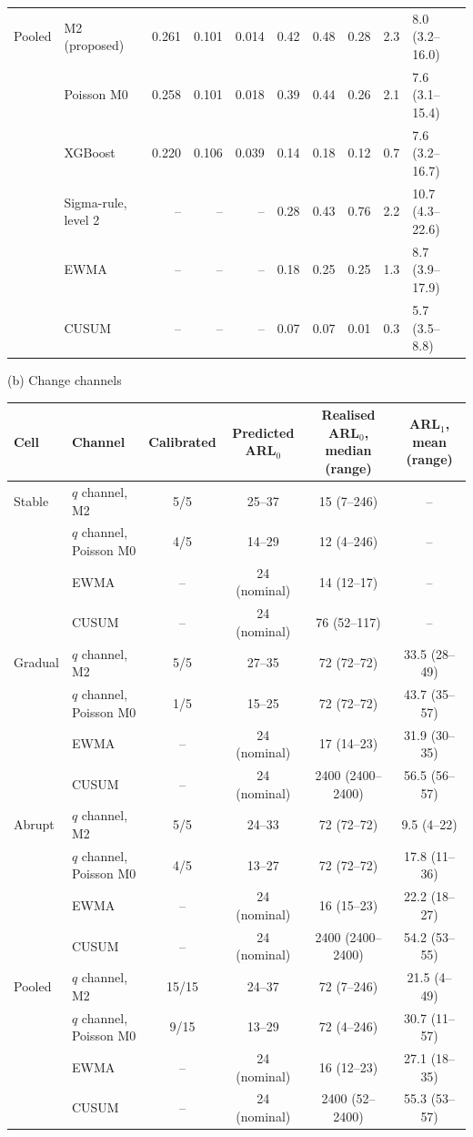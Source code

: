 \documentclass[10pt,a4paper]{article}
\begin{document}
{\begin{tabular}{llrrrrrrrl}
\addlinespace
Pooled & M2 (proposed) & 0.261 & 0.101 & 0.014 & 0.42 & 0.48 & 0.28 & 2.3 & 8.0 (3.2--16.0) \\
 & Poisson M0 & 0.258 & 0.101 & 0.018 & 0.39 & 0.44 & 0.26 & 2.1 & 7.6 (3.1--15.4) \\
 & XGBoost & 0.220 & 0.106 & 0.039 & 0.14 & 0.18 & 0.12 & 0.7 & 7.6 (3.2--16.7) \\
 & Sigma-rule, level 2 & -- & -- & -- & 0.28 & 0.43 & 0.76 & 2.2 & 10.7 (4.3--22.6) \\
 & EWMA & -- & -- & -- & 0.18 & 0.25 & 0.25 & 1.3 & 8.7 (3.9--17.9) \\
 & CUSUM & -- & -- & -- & 0.07 & 0.07 & 0.01 & 0.3 & 5.7 (3.5--8.8) \\
\bottomrule
\end{tabular}

\vspace{4pt}
(b) Change channels\\[2pt]
\begin{tabular}{llcccc}
\toprule
Cell & Channel & Calibrated & Predicted ARL$_0$ & Realised ARL$_0$, median (range) & ARL$_1$, mean (range) \\
\midrule
Stable & $q$ channel, M2 & 5/5 & 25--37 & 15 (7--246) & -- \\
 & $q$ channel, Poisson M0 & 4/5 & 14--29 & 12 (4--246) & -- \\
 & EWMA & -- & 24 (nominal) & 14 (12--17) & -- \\
 & CUSUM & -- & 24 (nominal) & 76 (52--117) & -- \\
\addlinespace
Gradual & $q$ channel, M2 & 5/5 & 27--35 & 72 (72--72) & 33.5 (28--49) \\
 & $q$ channel, Poisson M0 & 1/5 & 15--25 & 72 (72--72) & 43.7 (35--57) \\
 & EWMA & -- & 24 (nominal) & 17 (14--23) & 31.9 (30--35) \\
 & CUSUM & -- & 24 (nominal) & 2400 (2400--2400) & 56.5 (56--57) \\
\addlinespace
Abrupt & $q$ channel, M2 & 5/5 & 24--33 & 72 (72--72) & 9.5 (4--22) \\
 & $q$ channel, Poisson M0 & 4/5 & 13--27 & 72 (72--72) & 17.8 (11--36) \\
 & EWMA & -- & 24 (nominal) & 16 (15--23) & 22.2 (18--27) \\
 & CUSUM & -- & 24 (nominal) & 2400 (2400--2400) & 54.2 (53--55) \\
\addlinespace
Pooled & $q$ channel, M2 & 15/15 & 24--37 & 72 (7--246) & 21.5 (4--49) \\
 & $q$ channel, Poisson M0 & 9/15 & 13--29 & 72 (4--246) & 30.7 (11--57) \\
 & EWMA & -- & 24 (nominal) & 16 (12--23) & 27.1 (18--35) \\
 & CUSUM & -- & 24 (nominal) & 2400 (52--2400) & 55.3 (53--57) \\
\bottomrule
\end{tabular}

}
\vspace{8pt}
\end{document}
